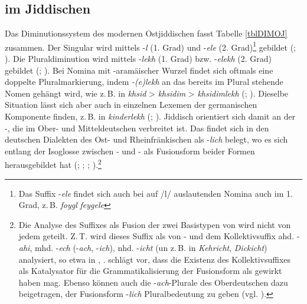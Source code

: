 \subsection{ im Jiddischen}\label{dimJIDDISCH}
Das Diminutionssystem des modernen Ostjiddischen fasst Tabelle  \ref{tblDIMOJ} zusammen. Der Singular wird mittels -\textit{l} (1. Grad) und -\textit{ele} (2. Grad)\footnote{Das Suffix -\textit{ele} findet sich auch bei auf /l/ auslautenden Nomina auch im 1. Grad, z.\,B.  \textit{foygl}   \textit{feygele} } gebildet (\cite[69]{Jacobs2005}; \cite[80]{Perlmutter1988}). Die Pluraldiminution wird mittels -\textit{lekh} (1. Grad) bzw. -\textit{elekh} (2. Grad) gebildet (\cite[162–163]{Jacobs2005}; \cite[80]{Perlmutter1988}). Bei Nomina mit -aramäischer Wurzel findet sich oftmals eine doppelte  Pluralmarkierung, indem \textit{-(e)lekh} an das bereits im Plural stehende Nomen gehängt wird, wie z.\,B. in  \textit{khsid}  >  \textit{khsidim}  >  \textit{khsidimlekh}  (\cite[163]{Jacobs2005}; \cite{Perlmutter1988}). Dieselbe Situation lässt sich aber auch in einzelnen Lexemen der germanischen Komponente finden, z.\,B. in  \textit{kinderlekh}  (\cite[163]{Jacobs2005}; \cite{Perlmutter1988}). Jiddisch orientiert sich damit an der -, die im Ober- und Mitteldeutschen verbreitet ist. Das  findet sich in den deutschen Dialekten des Ost- und Rheinfränkischen als -\textit{lich} belegt, wo es sich entlang der Isoglosse zwischen - und - als Fusionsform beider Formen herausgebildet hat (\cite[647]{Grimm1890}; \cite[245]{Weinhold1867}; \cite[124]{Wrede1908}; \cite[49]{Paul1920}).\footnote{Die Analyse des Suffixes als Fusion der zwei Basistypen von  wird nicht von jedem geteilt. Z.\,T. wird dieses Suffix als  von - und dem Kollektivsuffix ahd. -\textit{ahi}, mhd. -\textit{ech} (-\textit{ach}, -\textit{ich}), nhd. -\textit{icht} (un z.\,B. in \textit{Kehricht}, \textit{Dickicht}) analysiert, so etwa in \textcite[484]{Schirmunski1962}, \textcite[110–112]{Timm2005}. \textcite[235]{Weinhold1867} schlägt vor, dass die Existenz des Kollektivsuffixes als Katalysator für die Grammatikalisierung der Fusionsform als  gewirkt haben mag. Ebenso können auch die -\textit{ach}-Plurale des Oberdeutschen dazu beigetragen, der Fusionsform -\textit{lich} Pluralbedeutung zu geben (vgl. \cite{Rowley1994}).}\\ 



